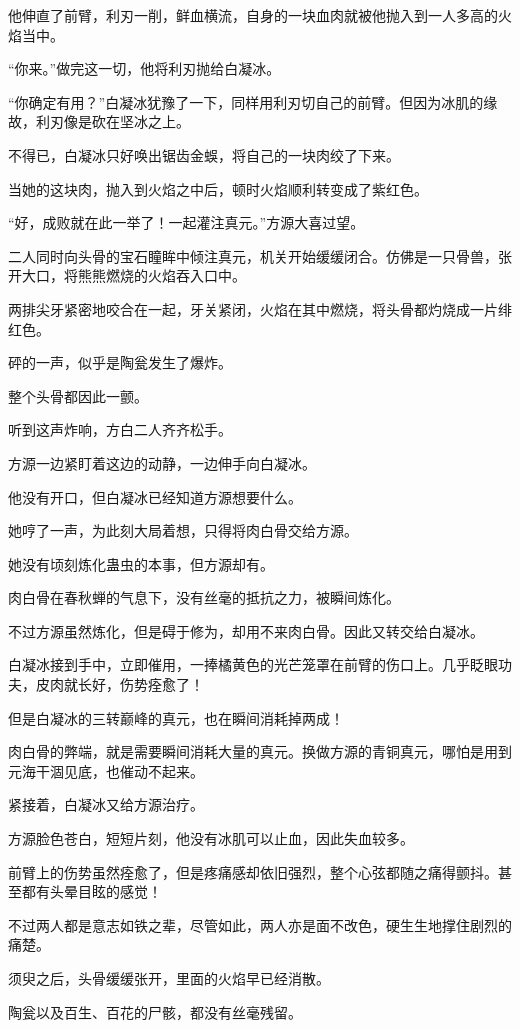 \begin{this_body}
他伸直了前臂，利刃一削，鲜血横流，自身的一块血肉就被他抛入到一人多高的火焰当中。

“你来。”做完这一切，他将利刃抛给白凝冰。

“你确定有用？”白凝冰犹豫了一下，同样用利刃切自己的前臂。但因为冰肌的缘故，利刃像是砍在坚冰之上。

不得已，白凝冰只好唤出锯齿金蜈，将自己的一块肉绞了下来。

当她的这块肉，抛入到火焰之中后，顿时火焰顺利转变成了紫红色。

“好，成败就在此一举了！一起灌注真元。”方源大喜过望。

二人同时向头骨的宝石瞳眸中倾注真元，机关开始缓缓闭合。仿佛是一只骨兽，张开大口，将熊熊燃烧的火焰吞入口中。

两排尖牙紧密地咬合在一起，牙关紧闭，火焰在其中燃烧，将头骨都灼烧成一片绯红色。

砰的一声，似乎是陶瓮发生了爆炸。

整个头骨都因此一颤。

听到这声炸响，方白二人齐齐松手。

方源一边紧盯着这边的动静，一边伸手向白凝冰。

他没有开口，但白凝冰已经知道方源想要什么。

她哼了一声，为此刻大局着想，只得将肉白骨交给方源。

她没有顷刻炼化蛊虫的本事，但方源却有。

肉白骨在春秋蝉的气息下，没有丝毫的抵抗之力，被瞬间炼化。

不过方源虽然炼化，但是碍于修为，却用不来肉白骨。因此又转交给白凝冰。

白凝冰接到手中，立即催用，一捧橘黄色的光芒笼罩在前臂的伤口上。几乎眨眼功夫，皮肉就长好，伤势痊愈了！

但是白凝冰的三转巅峰的真元，也在瞬间消耗掉两成！

肉白骨的弊端，就是需要瞬间消耗大量的真元。换做方源的青铜真元，哪怕是用到元海干涸见底，也催动不起来。

紧接着，白凝冰又给方源治疗。

方源脸色苍白，短短片刻，他没有冰肌可以止血，因此失血较多。

前臂上的伤势虽然痊愈了，但是疼痛感却依旧强烈，整个心弦都随之痛得颤抖。甚至都有头晕目眩的感觉！

不过两人都是意志如铁之辈，尽管如此，两人亦是面不改色，硬生生地撑住剧烈的痛楚。

须臾之后，头骨缓缓张开，里面的火焰早已经消散。

陶瓮以及百生、百花的尸骸，都没有丝毫残留。


\end{this_body}
